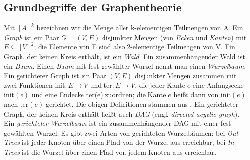 \subsection{Grundbegriffe der Graphentheorie}
Mit $[A]^k$ bezeichnen wir die Menge aller k-elementigen Teilmengen von A.
Ein \emph{Graph} ist ein Paar $G = (V, E)$ disjunkter Mengen (von \emph{Ecken} und \emph{Kanten}) mit $E \subseteq [V]^2$; die Elemente von E sind also 2-elementige Teilmengen von V.
Ein Graph, der keinen Kreis enthält, ist ein \emph{Wald}.
Ein zusammenhängender Wald ist ein \emph{Baum}.
Einen \emph{Baum} mit fest gewählter Wurzel nennt man einen \emph{Wurzelbaum}.
Ein gerichteter Graph ist ein Paar $(V, E)$ disjunkter Mengen zusammen mit zwei Funktionen
init$: E \rightarrow V$ und 
ter$: E \rightarrow V$, die jeder Kante $e$ eine Anfangsecke init$(e)$ und eine Endecke ter(e) zuordnen;
die Kante $e$ heißt dann von init$(e)$ nach ter$(e)$ gerichtet.
Die obigen Definitionen stammen aus \citet{graphentheorie}.
Ein gerichteter Graph, der keinen Kreis enthält heißt auch \emph{DAG} (engl. \emph{directed acyclic graph}).
Ein \emph{gerichteter Wurzelbaum} ist ein zusammenhängender DAG mit einer fest gewählten Wurzel.
Es gibt zwei Arten von gerichteten Wurzelbäumen: bei \emph{Out-Trees} ist jeder Knoten über einen Pfad von der Wurzel aus erreichbar, bei \emph{In-Trees} ist die Wurzel über einen Pfad von jedem Knoten aus erreichbar.


